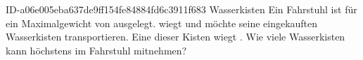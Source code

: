 \begin{exercise}
      {ID-a06e005eba637de9ff154fe84884fd6c3911f683}
      {Wasserkisten}
  \ifproblem\problem
    Ein Fahrstuhl ist für ein Maximalgewicht von  ausgelegt.
    \xya{} wiegt  und möchte seine eingekauften Wasserkisten
    transportieren. Eine dieser Kisten wiegt . Wie viele
    Wasserkisten kann \xya{} höchstens im Fahrstuhl mitnehmen?
  \fi
\end{exercise}
